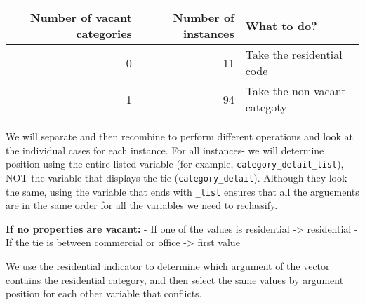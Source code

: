 \documentclass[]{article}
\begin{document}
\begin{longtable}[]{@{}rrl@{}}
\toprule
Number of vacant categories & Number of instances & What to
do?\tabularnewline
\midrule
\endhead
0 & 11 & Take the residential code\tabularnewline
1 & 94 & Take the non-vacant categoty\tabularnewline
\bottomrule
\end{longtable}

We will separate and then recombine to perform different operations and
look at the individual cases for each instance. For all instances- we
will determine position using the entire listed variable (for example,
\texttt{category\_detail\_list}), NOT the variable that displays the tie
(\texttt{category\_detail}). Although they look the same, using the
variable that ends with \texttt{\_list} ensures that all the arguements
are in the same order for all the variables we need to reclassify.

\textbf{If no properties are vacant:} - If one of the values is
residential -\textgreater{} residential - If the tie is between
commercial or office -\textgreater{} first value

We use the residential indicator to determine which argument of the
vector contains the residential category, and then select the same
values by argument position for each other variable that conflicts.
\end{document}
